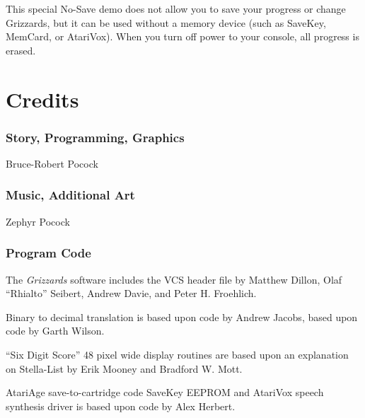 \documentclass[9pt,twocolumn,openany,article,crop]{memoir}
\begin{document}
\fi

\ifdefined\NOSAVE

{}

This special  No-Save demo does not  allow you to save  your progress or
change Grizzards,  but it can be  used without a memory  device (such as
SaveKey, MemCard, or AtariVox). When you turn off power to your console,
all progress is erased.

\fi

\fi %


\vfill

\pagebreak

\chapter{Credits}

\subsection{Story, Programming, Graphics}

{ Bruce-Robert Pocock }

\subsection{Music, Additional Art}

{ Zephyr Pocock }

\subsection{Program Code}

The \textit{Grizzards} software includes the  VCS header file by Matthew
Dillon, Olaf ``Rhialto'' Seibert, Andrew Davie, and Peter H. Froehlich.

Binary to decimal translation is based upon code by Andrew Jacobs, based
upon code by Garth Wilson.

``Six Digit  Score'' 48 pixel  wide display  routines are based  upon an
explanation on Stella-List by Erik Mooney and Bradford W. Mott.

\ifdefined\ATARIAGESAVE  AtariAge save-to-cartridge  code \else  SaveKey
  EEPROM \fi{} and  AtariVox speech synthesis driver is  based upon code
by Alex Herbert.
\end{document}
